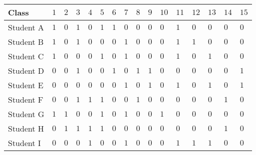 \documentclass[11pt]{article}
\begin{document}
\begin{table}[h]
\begin{tabular}{|a||l|l|l|l|l|l|l|l|l|l|l|l|l|l|l|} \hline
{}Class & $1$ & $2$ & $3$ & $4$ & $5$ & $6$ &
$7$ & $8$ & $9$ & $10$ & $11$ & $12$ & $13$
& $14$ & $15$ \\ \hline \hline
Student A & $1$ & $0$ & $1$ & $0$ & $1$ & $1$
& $0$ & $0$ & $0$ & $0$ & $1$ & $0$ & $0$
& $0$ & $0$ \\ \hline
Student B & $1$ & $0$ & $1$ & $0$ & $0$ & $0$
& $1$ & $0$ & $0$ & $0$ & $1$ & $1$ & $0$
& $0$ & $0$ \\ \hline
Student C & $1$ & $0$ & $0$ & $0$ & $1$ & $0$
& $1$ & $0$ & $0$ & $0$ & $1$ & $0$ & $1$
& $0$ & $0$ \\ \hline
Student D & $0$ & $0$ & $1$ & $0$ & $0$ & $1$
& $0$ & $1$ & $1$ & $0$ & $0$ & $0$ & $0$
& $0$ & $1$ \\ \hline
Student E & $0$ & $0$ & $0$ & $0$ & $0$ & $0$
& $1$ & $0$ & $1$ & $0$ & $1$ & $0$ & $1$
& $0$ & $1$ \\ \hline
Student F & $0$ & $0$ & $1$ & $1$ & $1$ & $0$
& $0$ & $1$ & $0$ & $0$ & $0$ & $0$ & $0$
& $1$ & $0$ \\ \hline
Student G & $1$ & $1$ & $0$ & $0$ & $1$ & $0$
& $1$ & $0$ & $0$ & $1$ & $0$ & $0$ & $0$
& $0$ & $0$ \\ \hline
Student H & $0$ & $1$ & $1$ & $1$ & $1$ & $0$
& $0$ & $0$ & $0$ & $0$ & $0$ & $0$ & $0$
& $1$ & $0$ \\ \hline
Student I & $0$ & $0$ & $0$ & $1$ & $0$ & $0$
& $1$ & $0$ & $0$ & $0$ & $1$ & $1$ & $1$
& $0$ & $0$ \\ \hline

\end{tabular}
\end{table}
\end{document}
